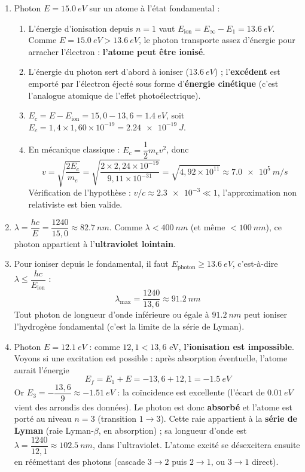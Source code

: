 \documentclass[11pt]{article}
\begin{document}
\begin{corrige}
\begin{enumerate}
\item Photon $E = \SI{15,0}{eV}$ sur un atome à l'état fondamental :
\begin{enumerate}
\item L'énergie d'ionisation depuis $n = 1$ vaut $E_{\text{ion}} = E_\infty - E_1 = \SI{13,6}{eV}$. Comme $E = \SI{15,0}{eV} > \SI{13,6}{eV}$, le photon transporte assez d'énergie pour arracher l'électron : \textbf{l'atome peut être ionisé}.
\item L'énergie du photon sert d'abord à ioniser ($\SI{13,6}{eV}$) ; l'\textbf{excédent} est emporté par l'électron éjecté sous forme d'\textbf{énergie cinétique} (c'est l'analogue atomique de l'effet photoélectrique).
\item $E_c = E - E_{\text{ion}} = 15,0 - 13,6 = \SI{1,4}{eV}$, soit $E_c = 1,4 \times 1,60\times 10^{-19} = \SI{2,24e-19}{J}$.
\item En mécanique classique : $E_c = \dfrac{1}{2}m_e v^2$, donc
\[
v = \sqrt{\frac{2E_c}{m_e}} = \sqrt{\frac{2\times 2,24\times 10^{-19}}{9,11\times 10^{-31}}} = \sqrt{4,92\times 10^{11}} \approx \SI{7,0e5}{m/s}
\]
Vérification de l'hypothèse : $v/c \approx \num{2,3e-3} \ll 1$, l'approximation non relativiste est bien valide.
\end{enumerate}
\item $\lambda = \dfrac{hc}{E} = \dfrac{1240}{15,0} \approx \SI{82,7}{nm}$. Comme $\lambda < \SI{400}{nm}$ (et même $< \SI{100}{nm}$), ce photon appartient à l'\textbf{ultraviolet lointain}.
\item Pour ioniser depuis le fondamental, il faut $E_{\text{photon}} \geq \SI{13,6}{eV}$, c'est-à-dire $\lambda \leq \dfrac{hc}{E_{\text{ion}}}$ :
\[
\lambda_{\max} = \frac{1240}{13,6} \approx \SI{91,2}{nm}
\]
Tout photon de longueur d'onde inférieure ou égale à $\SI{91,2}{nm}$ peut ioniser l'hydrogène fondamental (c'est la limite de la série de Lyman).
\item Photon $E = \SI{12,1}{eV}$ : comme $12,1 < 13,6$ eV, \textbf{l'ionisation est impossible}. Voyons si une excitation est possible : après absorption éventuelle, l'atome aurait l'énergie
\[
E_f = E_1 + E = -13,6 + 12,1 = \SI{-1,5}{eV}
\]
Or $E_3 = -\dfrac{13,6}{9} \approx \SI{-1,51}{eV}$ : la coïncidence est excellente (l'écart de $\SI{0,01}{eV}$ vient des arrondis des données). Le photon est donc \textbf{absorbé} et l'atome est porté au niveau \textbf{$n = 3$} (transition $1 \to 3$). Cette raie appartient à la \textbf{série de Lyman} (raie Lyman-$\beta$, en absorption) ; sa longueur d'onde est $\lambda = \dfrac{1240}{12,1} \approx \SI{102,5}{nm}$, dans l'ultraviolet. L'atome excité se désexcitera ensuite en réémettant des photons (cascade $3\to2$ puis $2\to1$, ou $3\to1$ direct).

\end{enumerate}
\end{corrige}
\end{document}
